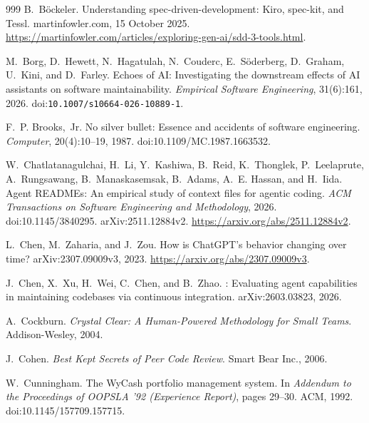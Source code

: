 \documentclass[11pt,a4paper]{article}
\begin{document}
\begin{thebibliography}{999}
B.~B\"ockeler.
\newblock Understanding spec-driven-development: {Kiro}, spec-kit, and {Tessl}.
\newblock martinfowler.com, 15 October 2025.
\newblock \url{https://martinfowler.com/articles/exploring-gen-ai/sdd-3-tools.html}.

M.~Borg, D.~Hewett, N.~Hagatulah, N.~Couderc, E.~S\"oderberg, D.~Graham,
U.~Kini, and D.~Farley.
\newblock Echoes of {AI}: Investigating the downstream effects of {AI}
assistants on software maintainability.
\newblock \emph{Empirical Software Engineering}, 31(6):161, 2026.
\newblock doi:\nolinkurl{10.1007/s10664-026-10889-1}.

F.~P. Brooks,~Jr.
\newblock No silver bullet: Essence and accidents of software engineering.
\newblock \emph{Computer}, 20(4):10--19, 1987.
\newblock doi:10.1109/MC.1987.1663532.

W.~Chatlatanagulchai, H.~Li, Y.~Kashiwa, B.~Reid, K.~Thonglek,
P.~Leelaprute, A.~Rungsawang, B.~Manaskasemsak, B.~Adams, A.~E. Hassan,
and H.~Iida.
\newblock Agent {READMEs}: An empirical study of context files for agentic coding.
\newblock \emph{ACM Transactions on Software Engineering and Methodology},
2026\@. doi:10.1145/3840295. arXiv:2511.12884v2.
\newblock \url{https://arxiv.org/abs/2511.12884v2}.

\begingroup
\raggedright
L.~Chen, M.~Zaharia, and J.~Zou.
\newblock How is ChatGPT's behavior changing over time?
\newblock arXiv:2307.09009v3, 2023.
\newblock \url{https://arxiv.org/abs/2307.09009v3}.
\par
\endgroup

J.~Chen, X.~Xu, H.~Wei, C.~Chen, and B.~Zhao.
: Evaluating agent capabilities in maintaining codebases via
continuous integration.
\newblock arXiv:2603.03823, 2026.

A.~Cockburn.
\newblock \emph{Crystal Clear: A Human-Powered Methodology for Small Teams}.
\newblock Addison-Wesley, 2004.

J.~Cohen.
\newblock \emph{Best Kept Secrets of Peer Code Review}.
\newblock Smart Bear Inc., 2006.

W.~Cunningham.
\newblock The {WyCash} portfolio management system.
\newblock In \emph{Addendum to the Proceedings of OOPSLA '92 (Experience
Report)}, pages 29--30. ACM, 1992.
\newblock doi:10.1145/157709.157715.


\end{thebibliography}
\end{document}
